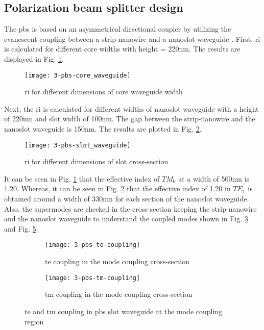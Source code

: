 \documentclass[../report.tex]{subfiles}
\begin{document}
\subsection{Polarization beam splitter design}
The \gls{pbs} is based on an asymmetrical directional coupler by utilizing the evanescent coupling between a strip-nanowire and a nanoslot waveguide \cite{pbs_dai_2011}. First, \gls{ri} is calculated for different core widths with height = 220nm. The results are displayed in Fig. \ref{fig:3_pbs_core_waveguide}.
\begin{figure}[H] %
	\centering
	\texttt{[image: 3-pbs-core\_waveguide]}
	\caption{\gls{ri} for different dimensions of core waveguide width}
	\label{fig:3_pbs_core_waveguide}
\end{figure}
\noindent Next, the \gls{ri} is calculated for different widths of nanoslot waveguide with a height of 220nm and slot width of 100nm. The gap between the strip-nanowire and the nanoslot waveguide is 150nm. The results are plotted in Fig. \ref{fig:3_pbs_slot_waveguide}.
\begin{figure}[H] %
	\centering
	\texttt{[image: 3-pbs-slot\_waveguide]}
	\caption{\gls{ri} for different dimensions of slot cross-section}
	\label{fig:3_pbs_slot_waveguide}
\end{figure}
\noindent It can be seen in Fig. \ref{fig:3_pbs_core_waveguide} that the effective index of $TM_0$ at a width of 500nm is 1.20. Whereas, it can be seen in Fig. \ref{fig:3_pbs_slot_waveguide} that the effective index of 1.20 in $TE_1$ is obtained around a width of 330nm for each section of the nanoslot waveguide. Also, the supermodes are checked in the cross-section keeping the strip-nanowire and the nanoslot waveguide to understand the coupled modes shown in Fig. \ref{fig:3_pbs_te_coupling} and Fig. \ref{fig:3_pbs_tm_coupling}.
\begin{figure}[H] %
	\begin{subfigure}[t]{0.45\textwidth}
		\texttt{[image: 3-pbs-te-coupling]}
		\caption{\gls{te} coupling in the mode coupling cross-section}
		\label{fig:3_pbs_te_coupling}
	\end{subfigure}
	\hfill
	\begin{subfigure}[t]{0.45\textwidth}
		\texttt{[image: 3-pbs-tm-coupling]}
		\caption{\gls{tm} coupling in the mode coupling cross-section}
		\label{fig:3_pbs_tm_coupling}
	\end{subfigure}
	\caption{\gls{te} and \gls{tm} coupling in \gls{pbs} slot waveguide at the mode coupling region}
\end{figure}
\end{document}

